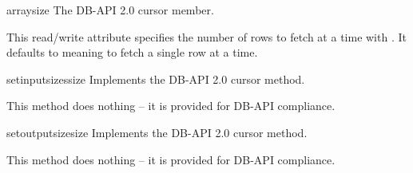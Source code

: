 \begin{memberdesc}[Cursor]{arraysize}
The DB-API 2.0 cursor  member.

This read/write attribute specifies the number of rows to fetch at a
time with .  It defaults to  meaning to
fetch a single row at a time.
\end{memberdesc}

\begin{methoddesc}[Cursor]{setinputsizes}{size}
Implements the DB-API 2.0 cursor  method.

This method does nothing -- it is provided for DB-API compliance.
\end{methoddesc}

\begin{methoddesc}[Cursor]{setoutputsize}{size }
Implements the DB-API 2.0 cursor  method.

This method does nothing -- it is provided for DB-API compliance.
\end{methoddesc}

%
%
%
%
%
